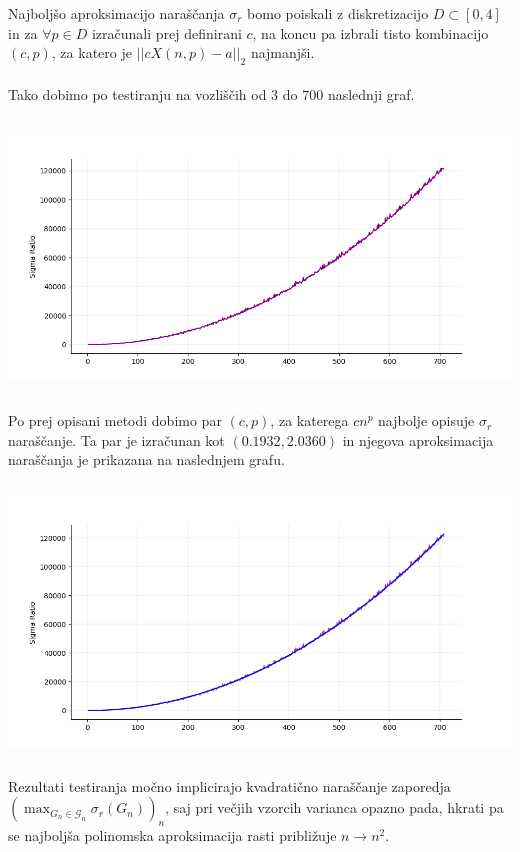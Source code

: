 \documentclass[ letterpaper, titlepage, fleqn]{article}
\begin{document}
Najboljšo aproksimacijo naraščanja $\sigma_r$ bomo poiskali 
z diskretizacijo $D \subset [0, 4]$ in za $\forall p \in D$ 
izračunali prej definirani $c$, na koncu pa izbrali tisto kombinacijo
$(c, p)$, za katero je $||cX(n, p) - a||_{2}$ najmanjši.
\\\\
Tako dobimo po testiranju na vozliščih od $3$ do $700$ naslednji graf.\\
\includegraphics[width=\textwidth, height=8cm]{graphics/sigma_opts.png} \\
Po prej opisani metodi dobimo par $(c, p)$, za katerega $cn^p$ najbolje opisuje
$\sigma_r$ naraščanje. Ta par je izračunan kot $(0.1932, 2.0360)$ in
njegova aproksimacija naraščanja je prikazana na naslednjem grafu.\\
\includegraphics[width=\textwidth, height=8cm]{graphics/sigma_opts_aproximation.png}\\
Rezultati testiranja močno implicirajo kvadratično naraščanje zaporedja 
$(\max_{G_n \in \mathscr{G}_n} \sigma_r(G_n))_n$, saj pri večjih vzorcih varianca opazno pada,
hkrati pa se najboljša polinomska aproksimacija rasti približuje $n \to n^2$.
\pagebreak
\end{document}
